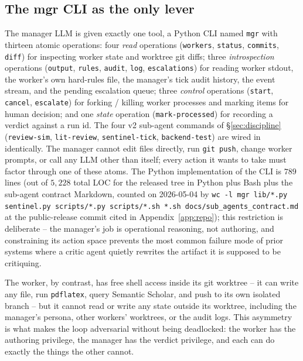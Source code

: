 \subsection{The mgr CLI as the only lever}
\label{sec:arch-mgr}

The manager LLM is given exactly one tool, a Python CLI named \texttt{mgr}
with thirteen atomic operations: four \emph{read} operations
(\texttt{workers}, \texttt{status}, \texttt{commits}, \texttt{diff}) for
inspecting worker state and worktree git diffs; three \emph{introspection}
operations (\texttt{output}, \texttt{rules}, \texttt{audit},
\texttt{log}, \texttt{escalations}) for reading worker stdout, the
worker's own hard-rules file, the manager's tick audit history, the
event stream, and the pending escalation queue; three \emph{control}
operations (\texttt{start}, \texttt{cancel}, \texttt{escalate}) for
forking / killing worker processes and marking items for human
decision; and one \emph{state} operation
(\texttt{mark-processed}) for recording a verdict against a run id.
The four v2 sub-agent commands of \S\ref{sec:discipline}
(\texttt{review-sim}, \texttt{lit-review}, \texttt{sentinel-tick},
\texttt{backend-test}) are wired in identically. The manager cannot edit
files directly, run \texttt{git push}, change worker prompts, or call
any LLM other than itself; every action it wants to take must factor
through one of these atoms. The Python implementation of the CLI is
\(789\) lines (out of \(5{,}228\) total LOC for the released tree in Python
plus Bash plus the sub-agent contract Markdown, counted on 2026-05-04 by
\texttt{wc -l mgr lib/*.py sentinel.py scripts/*.py scripts/*.sh *.sh docs/sub\_agents\_contract.md} at the public-release commit cited in
Appendix~\ref{app:repo}); this
restriction is deliberate -- the manager's job is operational reasoning,
not authoring, and constraining its action space prevents the most
common failure mode of prior systems where a critic agent quietly
rewrites the artifact it is supposed to be critiquing.

The worker, by contrast, has free shell access inside its git worktree --
it can write any file, run \texttt{pdflatex}, query Semantic Scholar, and
push to its own isolated branch -- but it cannot read or write any state
outside its worktree, including the manager's persona, other workers'
worktrees, or the audit logs. This asymmetry is what makes the loop
adversarial without being deadlocked: the worker has the authoring
privilege, the manager has the verdict privilege, and each can do exactly
the things the other cannot.

